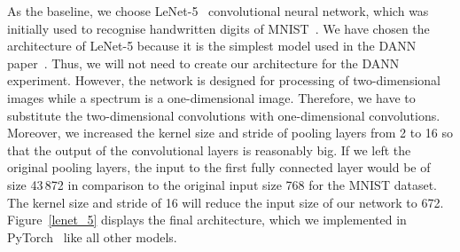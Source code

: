 As the baseline, we choose LeNet-5~\cite{lecun1998} convolutional neural network,
which was initially used to recognise handwritten digits of MNIST~\cite{lecun1998}.
We have chosen the architecture of LeNet-5
because it is the simplest model used in the DANN paper~\cite{ganin2016}.
Thus, we will not need to create our architecture for the DANN experiment.
However, the network is designed for processing of two-dimensional images
while a spectrum is a one-dimensional image.
Therefore, we have to substitute the two-dimensional convolutions with one-dimensional convolutions.
Moreover, we increased the kernel size and stride of pooling layers from 2 to 16
so that the output of the convolutional layers is reasonably big.
If we left the original pooling layers,
the input to the first fully connected layer would be of size 43\,872
in comparison to the original input size 768 for the MNIST dataset.
The kernel size and stride of 16 will reduce the input size of our network to 672.
Figure~\ref{lenet_5} displays the final architecture,
which we implemented in PyTorch~\cite{paszke2019} like all other models.

